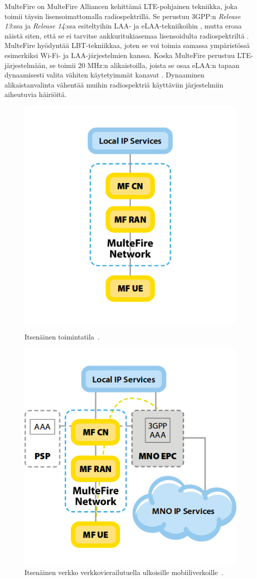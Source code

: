 \documentclass[finnish,12pt,a4paper,pdftex]{article}
\begin{document}
MulteFire on MulteFire Alliancen kehittämä LTE-pohjainen tekniikka, joka toimii täysin lisensoimattomalla radiospektrillä. Se perustuu 3GPP:n \textit{Release 13}:ssa ja \textit{Release 14}:ssa esiteltyihin LAA- ja eLAA-tekniikoihin \cite{chambers2016multefire}, mutta eroaa näistä siten, että se ei tarvitse ankkuritukiasemaa lisensoidulta radiospektriltä \cite{ismaiel2017survey, multefire2015lte}. MulteFire hyödyntää LBT-tekniikkaa, joten se voi toimia samassa ympäristössä esimerkiksi Wi-Fi- ja LAA-järjestelmien kanssa. Koska MulteFire perustuu LTE-järjestelmään, se toimii 20 MHz:n alikaistoilla, joista se osaa eLAA:n tapaan dynaamisesti valita vähiten käytetyimmät kanavat \cite{chambers2016multefire}. Dynaaminen alikaistanvalinta vähentää muihin radiospektriä käyttäviin järjestelmiin aiheutuvia häiriöitä.
~\begin{figure}[h!]
    \begin{minipage}{0.5\textwidth}
        \centering
        \includegraphics[width=0.5\linewidth]{Images/MF1.png}
        \caption{Itsenäinen toimintatila~\cite{chambers2016multefire}.}
        \label{fig:MF1}
    \end{minipage}
    \begin{minipage}{0.5\textwidth}
        \centering
        \includegraphics[width=0.5\linewidth]{Images/MF2.png}
        \caption{Itsenäinen verkko verkkovierailutuella ulkoisille mobiiliverkoille~\cite{chambers2016multefire}.}
        \label{fig:MF2}
    \end{minipage}
\end{figure}
\end{document}

